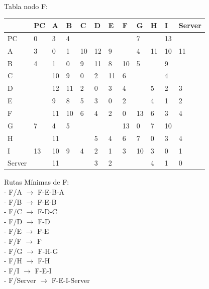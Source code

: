 \documentclass[a4paper]{article}
\begin{document}
\begin{table}[ht]
Tabla nodo F:\\
\begin{tabular}{|l|l|l|l|l|l|l|l|l|l|l|l|}
\hline
       & PC & A  & B & C & D & E & F & G & H & I  & Server \\ \hline
PC     & 0  & 3  & 4 &   &   &   &   & 7 &   & 13 &        \\ \hline
A      & 3  & 0  & 1 & 10& 12& 9 &   & 4 & 11& 10 & 11     \\ \hline
B      & 4  & 1  & 0 & 9 & 11& 8 & 10& 5 &   & 9  &        \\ \hline
C      &    & 10 & 9 & 0 & 2 & 11& 6 &   &   & 4  &        \\ \hline
D      &    & 12 & 11& 2 & 0 & 3 & 4 &   & 5 & 2  & 3      \\ \hline
E      &    & 9  & 8 & 5 & 3 & 0 & 2 &   & 4 & 1  & 2      \\ \hline
F      &    & 11 & 10& 6 & 4 & 2 & 0 & 13& 6 & 3  & 4      \\ \hline
G      & 7  & 4  & 5 &   &   &   & 13& 0 & 7 & 10 &        \\ \hline
H      &    & 11 &   &   & 5 & 4 & 6 & 7 & 0 & 3  & 4      \\ \hline
I      & 13 & 10 & 9 & 4 & 2 & 1 & 3 & 10& 3 & 0  & 1      \\ \hline
Server &    & 11 &   &   & 3 & 2 &   &   & 4 & 1  & 0      \\ \hline
\end{tabular}

Rutas Mínimas de F:\\
-	F/A  $\rightarrow$  F-E-B-A\\
-	F/B  $\rightarrow$ F-E-B\\
-	F/C  $\rightarrow$ F-D-C\\
-	F/D  $\rightarrow$  F-D\\
-	F/E  $\rightarrow$  F-E\\
-	F/F  $\rightarrow$  F\\
-	F/G  $\rightarrow$  F-H-G\\
-	F/H  $\rightarrow$  F-H\\
-	F/I  $\rightarrow$  F-E-I\\
-	F/Server  $\rightarrow$  F-E-I-Server\\
\end{table}

\clearpage
\end{document}
